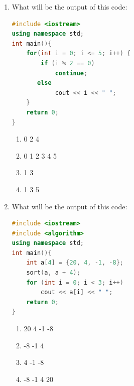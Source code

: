 \documentclass[10pt]{article}
\begin{document}
\begin{enumerate}


\item What will be the output of this code:
\begin{lstlisting}[language=C++]
#include <iostream>
using namespace std;
int main(){
    for(int i = 0; i <= 5; i++) {
        if (i % 2 == 0)
            continue;
       else
            cout << i << " ";
   	}
    return 0;
}
\end{lstlisting}
\begin{multicols}{4}
\begin{enumerate}
    \item 0 2 4 
    \item 0 1 2 3 4 5 
    \item 1 3
    \item 1 3 5 
\end{enumerate}
\end{multicols}











\item What will be the output of this code:
\begin{lstlisting}[language=C++]
#include <iostream>
#include <algorithm>
using namespace std;
int main(){
    int a[4] = {20, 4, -1, -8};
    sort(a, a + 4);
    for (int i = 0; i < 3; i++)
        cout << a[i] << " ";
    return 0;
}
\end{lstlisting}
\begin{multicols}{4}
\begin{enumerate}
    \item 20 4 -1 -8 
    \item  -8 -1 4
    \item 4 -1 -8
    \item -8 -1 4 20 
\end{enumerate}
\end{multicols}









\end{enumerate}
\end{document}
